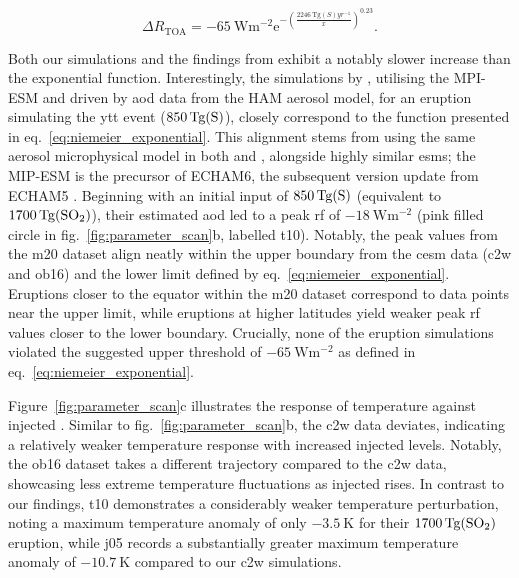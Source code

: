 \documentclass{ametsocV6.1}
\newcommand{\iso}[1][i]{{#1}njected \ce{SO2}}
\begin{document}
\begin{equation}
  \Delta
  R_{\mathrm{TOA}} =
  -\SI{65}{\watt\metre^{-2}}
  \mathrm{e}^{-{\left(\frac{\SI{2246}{\tera\gram(S)yr^{-1}}}{x}\right)}^{0.23}}.
  \label{eq:niemeier_exponential}
\end{equation}

Both our simulations and the findings from \citet{ottobliesner2016} exhibit a notably
slower increase than the exponential function. Interestingly, the simulations by
\citet{timmreck2010}, utilising the MPI-ESM and driven by \gls{aod} data from the HAM
aerosol model, for an eruption simulating the \gls{ytt} event
(\(\SI{850}{\tera\gram(\ce{S})}\)), closely correspond to the function presented in
eq.~\ref{eq:niemeier_exponential}. This alignment stems from using the same aerosol
microphysical model in both \citet{timmreck2010} and \citet{niemeier2015}, alongside
highly similar \glspl{esm}; the MIP-ESM is the precursor of ECHAM6, the subsequent
version update from ECHAM5 \citep{kuma2023}. Beginning with an initial input of
\(\SI{850}{\tera\gram(\ce{S})}\) (equivalent to \(\SI{1700}{\tera\gram(\ce{SO2})}\)),
their estimated \gls{aod} led to a peak \gls{rf} of \(\SI{-18}{\watt\metre^{-2}}\) (pink
filled circle in fig.~\ref{fig:parameter_scan}b, labelled \gls{t10}). Notably, the peak
values from the \gls{m20} dataset align neatly within the upper boundary from the
\gls{cesm} data (\gls{c2w} and \gls{ob16}) and the lower limit defined by
eq.~\ref{eq:niemeier_exponential}. Eruptions closer to the equator within the \gls{m20}
dataset correspond to data points near the upper limit, while eruptions at higher
latitudes yield weaker peak \gls{rf} values closer to the lower boundary. Crucially,
none of the eruption simulations violated the suggested upper threshold of
\(\SI{-65}{\watt\metre^{-2}}\) as defined in eq.~\ref{eq:niemeier_exponential}.

Figure~\ref{fig:parameter_scan}c illustrates the response of temperature against \iso{}.
Similar to fig.~\ref{fig:parameter_scan}b, the \gls{c2w} data deviates, indicating a
relatively weaker temperature response with increased \iso{} levels. Notably, the
\gls{ob16} dataset takes a different trajectory compared to the \gls{c2w} data,
showcasing less extreme temperature fluctuations as \iso{} rises. In contrast to our
findings, \gls{t10} demonstrates a considerably weaker temperature perturbation, noting
a maximum temperature anomaly of only \(\SI{-3.5}{\kelvin}\) for their
\(\SI{1700}{\tera\gram(\ce{SO2})}\) eruption, while \gls{j05} records a substantially
greater maximum temperature anomaly of \(\SI{-10.7}{\kelvin}\) compared to our \gls{c2w}
simulations.
\end{document}
